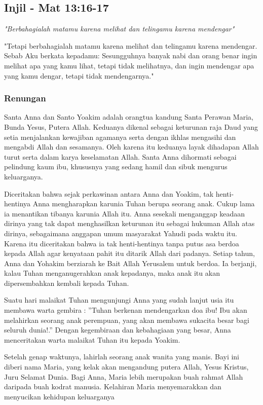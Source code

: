 \documentclass[a5paper,headsepline,titlepage,12pt,nnormalheadings,DIVcalc]{scrbook}
\begin{document}
\subsection*{Injil - Mat 13:16-17}
\textit{"Berbahagialah matamu karena melihat dan telingamu karena mendengar"
}

"Tetapi berbahagialah matamu karena melihat dan telingamu karena mendengar. Sebab Aku berkata kepadamu: Sesungguhnya banyak nabi dan orang benar ingin melihat apa yang kamu lihat, tetapi tidak melihatnya, dan ingin mendengar apa yang kamu dengar, tetapi tidak mendengarnya." 

\subsubsection*{Renungan}

Santa Anna dan Santo Yoakim adalah orangtua kandung Santa Perawan Maria, Bunda Yesus, Putera Allah. Keduanya dikenal sebagai keturunan raja Daud yang setia menjalankan kewajiban agamanya serta dengan ikhlas mengasihi dan mengabdi Allah dan sesamanya. Oleh karena itu keduanya layak dihadapan Allah turut serta dalam karya keselamatan Allah. Santa Anna dihormati sebagai pelindung kaum ibu, khususnya yang sedang hamil dan sibuk mengurus keluarganya. 

Diceritakan bahwa sejak perkawinan antara Anna dan Yoakim, tak henti-hentinya Anna mengharapkan karunia Tuhan berupa seorang anak. Cukup lama ia menantikan tibanya karunia Allah itu. Anna sesekali menganggap keadaan dirinya yang tak dapat menghasilkan keturunan itu sebagai hukuman Allah atas dirinya, sebagaimana anggapan umum masyarakat Yahudi pada waktu itu. Karena itu diceritakan bahwa ia tak henti-hentinya tanpa putus asa berdoa kepada Allah agar kenyataan pahit itu ditarik Allah dari padanya. Setiap tahun, Anna dan Yohakim berziarah ke Bait Allah Yerusalem untuk berdoa. Ia berjanji, kalau Tuhan menganugerahkan anak kepadanya, maka anak itu akan dipersembahkan kembali kepada Tuhan.

Suatu hari malaikat Tuhan mengunjungi Anna yang sudah lanjut usia itu membawa warta gembira : ”Tuhan berkenan mendengarkan doa ibu! Ibu akan melahirkan seorang anak perempuan, yang akan membawa sukacita besar bagi seluruh dunia!.” Dengan kegembiraan dan kebahagiaan yang besar, Anna menceritakan warta malaikat Tuhan itu kepada Yoakim.

Setelah genap waktunya, lahirlah seorang anak wanita yang manis. Bayi ini diberi nama Maria, yang kelak akan mengandung putera Allah, Yesus Kristus, Juru Selamat Dunia. Bagi Anna, Maria lebih merupakan buah rahmat Allah daripada buah kodrat manusia. Kelahiran Maria menyemarakkan dan menyucikan kehidupan keluarganya
\end{document}
